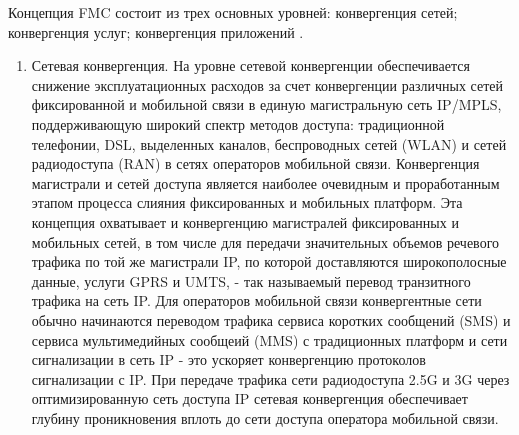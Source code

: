 Концепция FMC состоит из трех основных уровней: конвергенция сетей; конвергенция услуг; конвергенция приложений \cite{IMS}.
\begin{enumerate}
\item Сетевая конвергенция. На уровне сетевой конвергенции обеспечивается снижение эксплуатационных расходов за счет конвергенции различных сетей фиксированной и мобильной связи в единую магистральную сеть IP/MPLS, поддерживающую широкий спектр методов доступа: традиционной телефонии, DSL, выделенных каналов, беспроводных сетей (WLAN) и сетей радиодоступа (RAN) в сетях операторов мобильной связи. Конвергенция магистрали и сетей доступа является наиболее очевидным и проработанным этапом процесса слияния фиксированных и мобильных платформ. Эта концепция охватывает и конвергенцию магистралей фиксированных и мобильных сетей, в том числе для передачи значительных объемов речевого трафика по той же магистрали IP, по которой доставляются широкополосные данные, услуги GPRS и UMTS, - так называемый перевод транзитного трафика на сеть IP. Для операторов мобильной связи конвергентные сети обычно начинаются переводом трафика сервиса коротких сообщений (SMS) и сервиса мультимедийных сообщеий (MMS) с традиционных платформ и сети сигнализации в сеть IP - это ускоряет конвергенцию протоколов сигнализации с IP. При передаче трафика сети радиодоступа 2.5G и 3G через оптимизированную сеть доступа IP сетевая конвергенция обеспечивает глубину проникновения вплоть до сети доступа оператора мобильной связи.



\end{enumerate}

